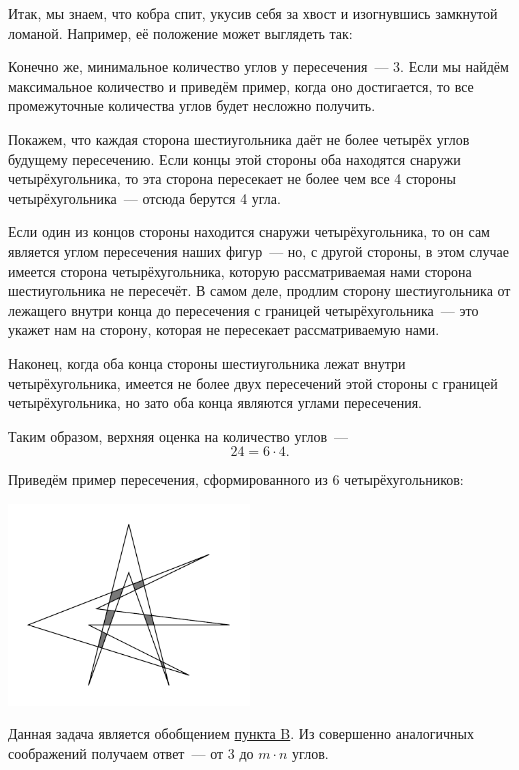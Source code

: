 
\begin{itemize}
\itA Итак, мы знаем, что кобра спит, укусив себя за хвост и изогнувшись замкнутой ломаной. Например, её положение может выглядеть так:

\begin{center}  \end{center}

\itB \label{float-ptb} Конечно же, минимальное количество углов у пересечения~— 3. Если мы найдём максимальное количество и приведём пример, когда оно достигается, то все промежуточные количества углов будет несложно получить.

Покажем, что каждая сторона шестиугольника даёт не более четырёх углов будущему пересечению. Если концы этой стороны оба находятся снаружи четырёхугольника, то эта сторона пересекает не более чем все 4 стороны четырёхугольника~--- отсюда берутся 4 угла.

Если один из концов стороны находится снаружи четырёхугольника, то он сам является углом пересечения наших фигур~--- но, с другой стороны, в этом случае имеется сторона четырёхугольника, которую рассматриваемая нами сторона шестиугольника не пересечёт. В самом деле, продлим сторону шестиугольника от лежащего внутри конца до пересечения с границей четырёхугольника~--- это укажет нам на сторону, которая не пересекает рассматриваемую нами.

Наконец, когда оба конца стороны шестиугольника лежат внутри четырёхугольника, имеется не более двух пересечений этой стороны с границей четырёхугольника, но зато оба конца являются углами пересечения.

Таким образом, верхняя оценка на количество углов~—
	$$24 = 6 \cdot 4.$$

Приведём пример пересечения, сформированного из 6 четырёхугольников:

\begin{center}
	\includegraphics[width=6.4cm]{figures/2017-8-3B}
\end{center}

\itC Данная задача является обобщением \hyperref[float-ptb]{пункта B}. Из совершенно аналогичных соображений получаем ответ~--- от 3 до $m \cdot n$ углов.

\end{itemize}
